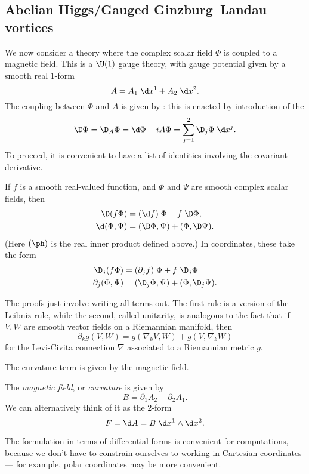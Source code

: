 \documentclass[a4paper]{article}
\begin{document}
\subsection{Abelian Higgs/Gauged Ginzburg--Landau vortices}
We now consider a theory where the complex scalar field $\Phi$ is coupled to a magnetic field. This is a $\U(1)$ gauge theory, with gauge potential given by a smooth real $1$-form
\[
  A = A_1 \;\d x^1 + A_2 \;\d x^2.
\]
The coupling between $\Phi$ and $A$ is given by : this is enacted by introduction of the \index{$\D$}
\[
  \D \Phi = \D_A \Phi = \d \Phi - i A \Phi = \sum_{j = 1}^2 \D_j \Phi \;\d x^j.
\]
To proceed, it is convenient to have a list of identities involving the covariant derivative.
\begin{prop}
  If $f$ is a smooth real-valued function, and $\Phi$ and $\Psi$ are smooth complex scalar fields, then
  \begin{align*}
    \D (f \Phi) &= (\d f) \; \Phi + f\;\D \Phi,\\
    \d (\Phi, \Psi) &= (\D \Phi, \Psi) + (\Phi, \D \Psi).
  \end{align*}
  (Here $(\ph)$ is the real inner product defined above.) In coordinates, these take the form
  \begin{align*}
    \D_j (f \Phi) &= (\partial_j f)\;\Phi + f\; \D_j \Phi\\
    \partial_j (\Phi, \Psi) &= (\D_j \Phi, \Psi) + (\Phi, \D_j \Psi).
  \end{align*}
\end{prop}
The proofs just involve writing all terms out. The first rule is a version of the Leibniz rule, while the second, called unitarity, is analogous to the fact that if $V, W$ are smooth vector fields on a Riemannian manifold, then
\[
  \partial_k g(V, W) = g(\nabla_k V, W) + g(V, \nabla_k W)
\]
for the Levi-Civita connection $\nabla$ associated to a Riemannian metric $g$.

The curvature term is given by the magnetic field.
\begin{defi}
  The \emph{magnetic field}, or \emph{curvature} is given by
  \[
    B = \partial_1 A_2 - \partial_2 A_1.
  \]
  We can alternatively think of it as the 2-form
  \[
    F = \d A = B \;\d x^1 \wedge\d x^2.
  \]
\end{defi}
The formulation in terms of differential forms is convenient for computations, because we don't have to constrain ourselves to working in Cartesian coordinates --- for example, polar coordinates may be more convenient.
\end{document}
